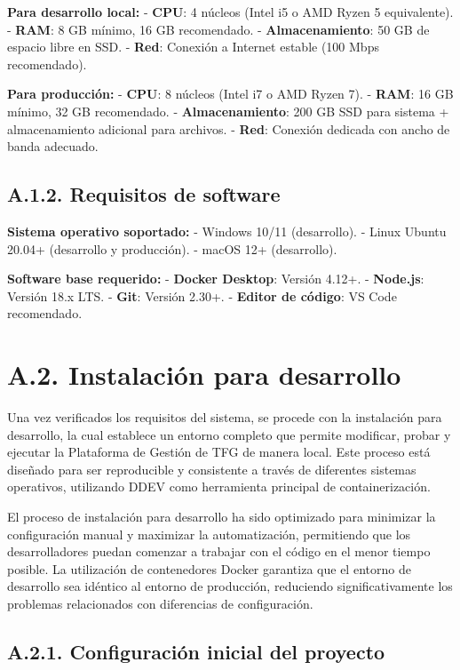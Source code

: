 \documentclass[12pt,a4paper,oneside]{report}
\begin{document}
\textbf{Para desarrollo local:} - \textbf{CPU}: 4 núcleos (Intel i5 o
AMD Ryzen 5 equivalente). - \textbf{RAM}: 8 GB mínimo, 16 GB
recomendado. - \textbf{Almacenamiento}: 50 GB de espacio libre en SSD. -
\textbf{Red}: Conexión a Internet estable (100 Mbps recomendado).

\textbf{Para producción:} - \textbf{CPU}: 8 núcleos (Intel i7 o AMD
Ryzen 7). - \textbf{RAM}: 16 GB mínimo, 32 GB recomendado. -
\textbf{Almacenamiento}: 200 GB SSD para sistema + almacenamiento
adicional para archivos. - \textbf{Red}: Conexión dedicada con ancho de
banda adecuado.

\subsection{A.1.2. Requisitos de
software}\label{a.1.2.-requisitos-de-software}

\textbf{Sistema operativo soportado:} - Windows 10/11 (desarrollo). -
Linux Ubuntu 20.04+ (desarrollo y producción). - macOS 12+ (desarrollo).

\textbf{Software base requerido:} - \textbf{Docker Desktop}: Versión
4.12+. - \textbf{Node.js}: Versión 18.x LTS. - \textbf{Git}: Versión
2.30+. - \textbf{Editor de código}: VS Code recomendado.

\section{A.2. Instalación para
desarrollo}\label{a.2.-instalaciuxf3n-para-desarrollo}

Una vez verificados los requisitos del sistema, se procede con la
instalación para desarrollo, la cual establece un entorno completo que
permite modificar, probar y ejecutar la Plataforma de Gestión de TFG de
manera local. Este proceso está diseñado para ser reproducible y
consistente a través de diferentes sistemas operativos, utilizando DDEV
como herramienta principal de containerización.

El proceso de instalación para desarrollo ha sido optimizado para
minimizar la configuración manual y maximizar la automatización,
permitiendo que los desarrolladores puedan comenzar a trabajar con el
código en el menor tiempo posible. La utilización de contenedores Docker
garantiza que el entorno de desarrollo sea idéntico al entorno de
producción, reduciendo significativamente los problemas relacionados con
diferencias de configuración.

\subsection{A.2.1. Configuración inicial del
proyecto}\label{a.2.1.-configuraciuxf3n-inicial-del-proyecto}
\end{document}
